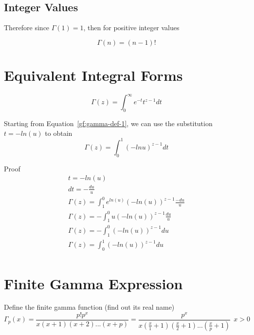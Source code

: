 \documentclass[a4paper]{article}
\begin{document}
    \subsection{Integer Values}\label{gf:subsec:integer-values}
    Therefore since $\Gamma(1) = 1$, then for positive integer values

    \begin{equation}
        \Gamma(n) = (n-1)!\label{gf:eq:equation2}
    \end{equation}


    \section{Equivalent Integral Forms}\label{gf:sec:equivalent-integral-forms}

    \begin{equation}
        \Gamma(z) = \int_{0}^{\infty} e^{-t} t^{z-1} dt\label{gf:eq:equation3}
    \end{equation}

    \begin{theorem}
        Starting from Equation~\ref{gf:gamma-def-1}, we can use the substitution $t = -ln(u)$ to obtain
        \begin{equation}
            \Gamma(z) = \int_{0}^{1} (-ln u)^{z-1} dt\label{gf:eq:equation4}
        \end{equation}

        Proof
        \begin{gather*}
            t = -ln(u) \\
            dt = - \frac{du}{u} \\
            \Gamma(z) = \int_{1}^{0} e^{ln(u)} (-ln(u))^{z-1} \frac{-du}{u} \\
            \Gamma(z) = - \int_{1}^{0} u (-ln(u))^{z-1} \frac{du}{u} \\
            \Gamma(z) = - \int_{1}^{0} (-ln(u))^{z-1} du \\
            \Gamma(z) = \int_{0}^{1} (-ln(u))^{z-1} du \\
        \end{gather*}
    \end{theorem}


    \section{Finite Gamma Expression}\label{gf:sec:finite-gamma-expression}
    Define the finite gamma function (find out its real name)
    \begin{equation}
        \label{gf:eq:finite-gamma-def}
        \Gamma_{p}(x) = \frac{p! p^x}{x (x+ 1)(x + 2)...(x + p)} = \frac{p^x}{x (\frac{x}{1} + 1)(\frac{x}{2} + 1)...(\frac{x}{p} + 1)}
        \ \ x>0
    \end{equation}
\end{document}
